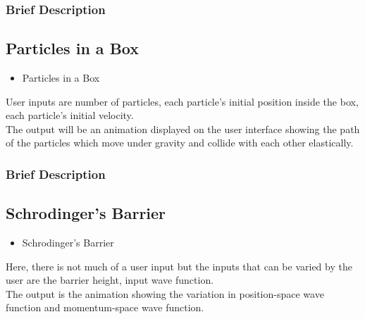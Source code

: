 \documentclass{beamer}
\begin{document}
\begin{frame}
\frametitle{Brief Description}
\subsection{Particles in a Box}
\begin{itemize}
\item Particles in a Box
\end{itemize}
User inputs are number of particles, each particle's initial position inside the box, each particle's initial velocity. \\
The output will be an animation displayed on the user interface showing the path of the particles which move under gravity and collide with each other elastically.
\end{frame}
\begin{frame}
\frametitle{Brief Description}
\subsection{Schrodinger's Barrier}
\begin{itemize}
\item Schrodinger's Barrier
\end{itemize}
Here, there is not much of a user input but the inputs that can be varied by the user are the barrier height, input wave function. \\
The output is the animation showing the variation in position-space wave function and momentum-space wave function.
\end{frame}
\end{document}
